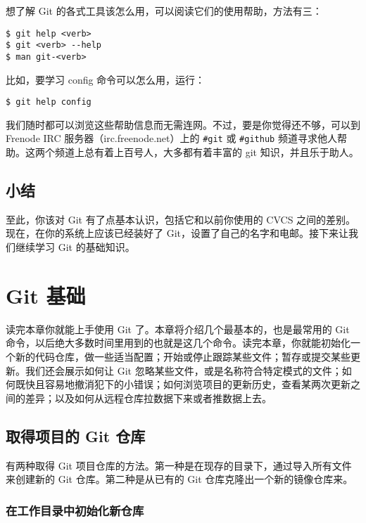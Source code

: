 \documentclass[a4paper]{book}
\newcommand{\chap}[1]{\newpage\thispagestyle{empty}\chapter{#1}\label{chap:\thechapter}}
\begin{document}
想了解 Git 的各式工具该怎么用，可以阅读它们的使用帮助，方法有三：

\begin{shaded}\begin{verbatim}
$ git help <verb>
$ git <verb> --help
$ man git-<verb>
\end{verbatim}\end{shaded}

比如，要学习 config 命令可以怎么用，运行：

\begin{shaded}\begin{verbatim}
$ git help config
\end{verbatim}\end{shaded}

我们随时都可以浏览这些帮助信息而无需连网。不过，要是你觉得还不够，可以到 Frenode IRC 服务器（irc.freenode.net）上的 \texttt{\#git} 或 \texttt{\#github} 频道寻求他人帮助。这两个频道上总有着上百号人，大多都有着丰富的 git 知识，并且乐于助人。

\section{小结}

至此，你该对 Git 有了点基本认识，包括它和以前你使用的 CVCS 之间的差别。现在，在你的系统上应该已经装好了 Git，设置了自己的名字和电邮。接下来让我们继续学习 Git 的基础知识。

\chap{Git 基础}

读完本章你就能上手使用 Git 了。本章将介绍几个最基本的，也是最常用的 Git 命令，以后绝大多数时间里用到的也就是这几个命令。读完本章，你就能初始化一个新的代码仓库，做一些适当配置；开始或停止跟踪某些文件；暂存或提交某些更新。我们还会展示如何让 Git 忽略某些文件，或是名称符合特定模式的文件；如何既快且容易地撤消犯下的小错误；如何浏览项目的更新历史，查看某两次更新之间的差异；以及如何从远程仓库拉数据下来或者推数据上去。

\section{取得项目的 Git 仓库}

有两种取得 Git 项目仓库的方法。第一种是在现存的目录下，通过导入所有文件来创建新的 Git 仓库。第二种是从已有的 Git 仓库克隆出一个新的镜像仓库来。

\subsection{在工作目录中初始化新仓库}
\end{document}

